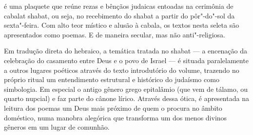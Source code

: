 \hspace*{-7cm}\hrulefill\hspace*{-7cm}

\medskip

 é uma plaquete que reúne rezas e bênçãos judaicas entoadas na cerimônia de cabalat shabat, ou seja, no recebimento do shabat a partir do pôr"-do"-sol da sexta"-feira. Com alto teor místico e alusão à cabala, os textos nesta seleta são apresentados como poemas. E de maneira secular, mas não anti"-religiosa.

Em tradução direta do hebraico, a temática tratada no shabat --- a encenação da celebração do casamento entre Deus e o povo de Israel --- é situada paralelamente a outros lugares poéticos através do texto introdutório do volume, trazendo no próprio ritual um entendimento estrutural e histórico do judaísmo como simbologia. Em especial o antigo gênero grego epitalâmio (que vem de tálamo, ou quarto nupcial) e faz parte do cânone lírico. Através dessa ótica, é apresentada na leitura dos poemas um Deus mais próximo de quem o procura no âmbito doméstico, numa manobra alegórica que transforma um dos menos divinos gêneros em um lugar de comunhão.


\vfill

\hspace*{-.4cm}\begin{minipage}[c]{.5\linewidth}
\small{
{}}
\end{minipage}


\pagebreak %


